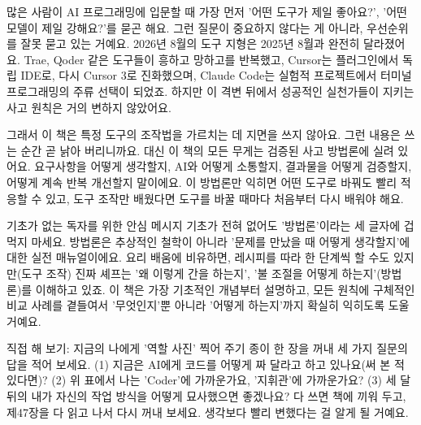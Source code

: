 많은 사람이 AI 프로그래밍에 입문할 때 가장 먼저 '어떤 도구가 제일 좋아요?', '어떤 모델이 제일 강해요?'를 묻곤 해요. 그런 질문이 중요하지 않다는 게 아니라, 우선순위를 잘못 묻고 있는 거예요. 2026년 8월의 도구 지형은 2025년 8월과 완전히 달라졌어요. Trae, Qoder 같은 도구들이 흥하고 망하고를 반복했고, Cursor는 플러그인에서 독립 IDE로, 다시 Cursor 3로 진화했으며, Claude Code는 실험적 프로젝트에서 터미널 프로그래밍의 주류 선택이 되었죠. 하지만 이 격변 뒤에서 성공적인 실천가들이 지키는 사고 원칙은 거의 변하지 않았어요.

그래서 이 책은 특정 도구의 조작법을 가르치는 데 지면을 쓰지 않아요. 그런 내용은 쓰는 순간 곧 낡아 버리니까요. 대신 이 책의 모든 무게는 검증된 사고 방법론에 실려 있어요. 요구사항을 어떻게 생각할지, AI와 어떻게 소통할지, 결과물을 어떻게 검증할지, 어떻게 계속 반복 개선할지 말이에요. 이 방법론만 익히면 어떤 도구로 바꿔도 빨리 적응할 수 있고, 도구 조작만 배웠다면 도구를 바꿀 때마다 처음부터 다시 배워야 해요.

\begin{tcbinfo}{기초가 없는 독자를 위한 안심 메시지}
기초가 전혀 없어도 '방법론'이라는 세 글자에 겁먹지 마세요. 방법론은 추상적인 철학이 아니라 '문제를 만났을 때 어떻게 생각할지'에 대한 실전 매뉴얼이에요. 요리 배움에 비유하면, 레시피를 따라 한 단계씩 할 수도 있지만(도구 조작) 진짜 셰프는 '왜 이렇게 간을 하는지', '불 조절을 어떻게 하는지'(방법론)를 이해하고 있죠. 이 책은 가장 기초적인 개념부터 설명하고, 모든 원칙에 구체적인 비교 사례를 곁들여서 '무엇인지'뿐 아니라 '어떻게 하는지'까지 확실히 익히도록 도울 거예요.

\end{tcbinfo}

\begin{tcbpractice}{직접 해 보기: 지금의 나에게 '역할 사진' 찍어 주기}
종이 한 장을 꺼내 세 가지 질문의 답을 적어 보세요. (1) 지금은 AI에게 코드를 어떻게 짜 달라고 하고 있나요(써 본 적 있다면)? (2) 위 표에서 나는 'Coder'에 가까운가요, '지휘관'에 가까운가요? (3) 세 달 뒤의 내가 자신의 작업 방식을 어떻게 묘사했으면 좋겠나요? 다 쓰면 책에 끼워 두고, 제47장을 다 읽고 나서 다시 꺼내 보세요. 생각보다 빨리 변했다는 걸 알게 될 거예요.

\end{tcbpractice}

